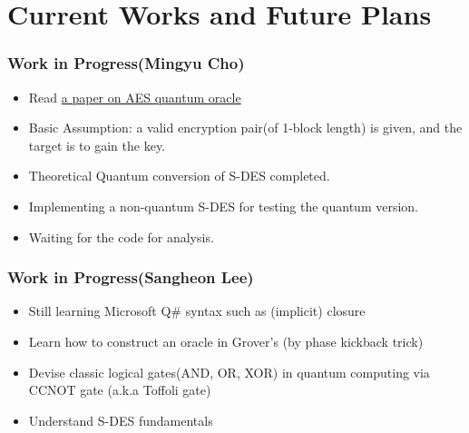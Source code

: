 \documentclass{beamer}
\begin{document}
	\section{Current Works and Future Plans}
	
	\begin{frame}
		\frametitle{Work in Progress(Mingyu Cho)}
		\begin{itemize}
			\item Read \href{https://arxiv.org/pdf/1512.04965.pdf}{a paper on AES quantum oracle}
			\item Basic Assumption: a valid encryption pair(of 1-block length) is given, and the target is to gain the key.
			\item Theoretical Quantum conversion of S-DES completed.
			\item Implementing a non-quantum S-DES for testing the quantum version.
			\item Waiting for the code for analysis.
		\end{itemize}
	\end{frame}
	
	\begin{frame}
		\frametitle{Work in Progress(Sangheon Lee)}
		\begin{itemize}
            \item Still learning Microsoft Q\# syntax such as (implicit) closure
			\item Learn how to construct an oracle in Grover's (by phase kickback trick)
            \item Devise classic logical gates(AND, OR, XOR) in quantum computing via CCNOT gate (a.k.a Toffoli gate)
            \item Understand S-DES fundamentals
		\end{itemize}
	\end{frame}
	
\end{document}
